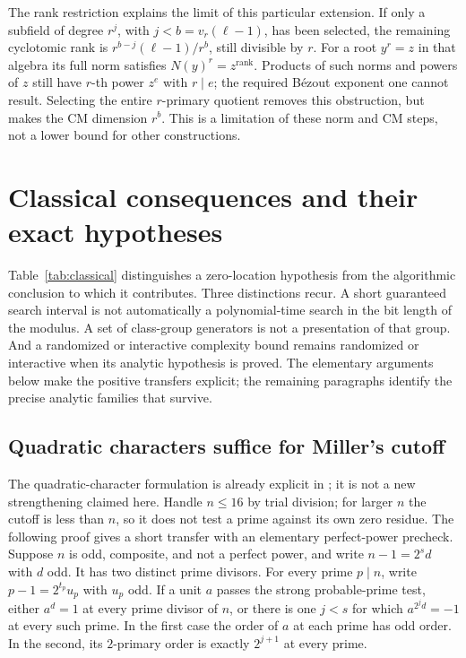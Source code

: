 \documentclass[11pt]{article}
\theoremstyle{definition}
\theoremstyle{remark}
\begin{document}
The rank restriction explains the limit of this particular extension.
If only a subfield of degree \(r^j\), with \(j<b=v_r(\ell-1)\),
has been selected, the remaining cyclotomic rank is
\(r^{b-j}(\ell-1)/r^b\), still divisible by \(r\).
For a root \(y^r=z\) in that algebra its full norm satisfies
\(N(y)^r=z^{\operatorname{rank}}\). Products of such norms and
powers of \(z\) still have \(r\)-th power \(z^e\) with
\(r\mid e\); the required B\'ezout exponent one cannot result.
Selecting the entire \(r\)-primary quotient removes this obstruction,
but makes the CM dimension \(r^b\). This is a limitation of these
norm and CM steps, not a lower bound for other constructions.


\section{Classical consequences and their exact hypotheses}
\label{sec:classical-consequences}

Table~\ref{tab:classical} distinguishes a zero-location hypothesis from the
algorithmic conclusion to which it contributes. Three distinctions recur.
A short guaranteed search interval is not automatically a polynomial-time
search in the bit length of the modulus. A set of class-group generators is
not a presentation of that group. And a randomized or interactive complexity
bound remains randomized or interactive when its analytic hypothesis is
proved. The elementary arguments below make the positive transfers explicit;
the remaining paragraphs identify the precise analytic families that survive.

\subsection{Quadratic characters suffice for Miller's cutoff}

The quadratic-character formulation is already explicit in
\citet[Theorem~2.2, pp.~105--106]{Schoof2008}; it is not a new strengthening
claimed here. Handle $n\le16$ by trial division; for larger $n$ the cutoff
is less than $n$, so it does not test a prime against its own zero residue.
The following proof gives a short transfer with an elementary
perfect-power precheck. Suppose $n$ is odd, composite, and not a perfect power,
and write $n-1=2^s d$ with $d$ odd. It has two distinct prime divisors.
For every prime $p\mid n$, write $p-1=2^{t_p}u_p$ with $u_p$ odd.
If a unit $a$ passes the strong probable-prime test, either $a^d=1$ at every
prime divisor of $n$, or there is one $j<s$ for which
$a^{2^j d}=-1$ at every such prime. In the first case the order of $a$ at
each prime has odd order. In the second, its $2$-primary order is exactly
$2^{j+1}$ at every prime.
\end{document}
